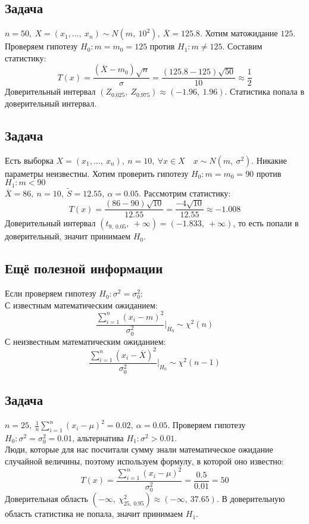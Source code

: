 \documentclass[12pt, a4paper]{article}
\begin{document}
\subsection*{Задача}
$n = 50,\ X = (x_1,\dots,\ x_n)\sim N(m,\ 10^2),\ \overline{X} = 125.8$. Хотим матожидание $125$.\\
Проверяем гипотезу $H_0: m = m_0 = 125$ против $H_1: m \neq 125$. Составим статистику:
\[T(x) = \frac{(\overline{X} - m_0)\sqrt{n}}{\sigma} = \frac{(125.8 - 125)\sqrt{50}}{10} \approx \frac{1}{2}\]
Доверительный интервал $(Z_{0.025},\ Z_{0.975}) \approx (-1.96,\ 1.96)$. Статистика попала в доверительный интервал.
\subsection*{Задача}
Есть выборка $X = (x_1,\dots,\ x_n),\ n = 10,\ \forall x \in X\quad x\sim N(m,\ \sigma^2)$. Никакие параметры неизвестны. Хотим проверить гипотезу $H_0: m = m_0 = 90$ против $H_1: m < 90$\\
$\overline{X} = 86,\ n = 10,\ \tilde S = 12.55,\ \alpha = 0.05$. Рассмотрим статистику:
\[T(x) = \frac{(86 - 90)\sqrt{10}}{12.55} = \frac{-4\sqrt{10}}{12.55} \approx -1.008\]
Доверительный интервал $(t_{9,\ 0.05},\ +\infty) = (-1.833,\ +\infty)$, то есть попали в доверительный, значит принимаем $H_0$.
\subsection*{Ещё полезной информации}
Если проверяем гипотезу $H_0: \sigma^2 = \sigma^2_0$:\\
С известным математическим ожиданием:
\[\frac{\sum_{i = 1}^{n} \left( x_i - m \right)^2}{\sigma_0^2}\big|_{H_0} \sim \chi^2(n)\]
С неизвестным математическим ожиданием:
\[\frac{\sum_{i = 1}^{n} \left( x_i - \overline{X} \right)^2}{\sigma_0^2}\big|_{H_0} \sim \chi^2(n - 1)\]
\subsection*{Задача}
$n = 25,\ \frac{1}{n}\sum_{i = 1}^{n}(x_i - \mu)^2 = 0.02,\ \alpha = 0.05$. Проверяем гипотезу $H_0: \sigma^2 = \sigma_0^2 = 0.01$, альтернатива $H_1: \sigma^2 > 0.01$.\\
Люди, которые для нас посчитали сумму знали математическое ожидание случайной величины, поэтому используем формулу, в которой оно известно:
\[T(x) = \frac{\sum_{i = 1}^{n}(x_i - \mu)^2}{\sigma_0^2} = \frac{0.5}{0.01} = 50\]
Доверительная область $(-\infty,\ \chi^2_{25,\ 0.95}) \approx (-\infty,\ 37.65)$. В доверительную область статистика не попала, значит принимаем $H_1$.
\end{document}
